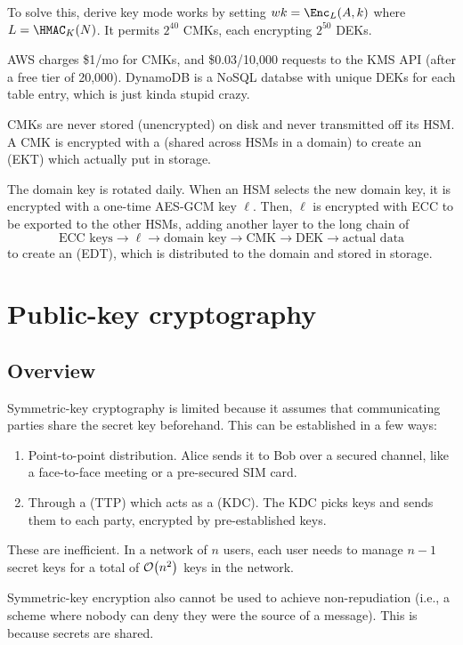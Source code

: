 \documentclass[class=co487,tikz,minted,notes]{agony}
\begin{document}
To solve this, derive key mode works by setting
$wk = \Enc_L(A,k)$ where $L = \HMAC_K(N)$.
It permits $2^{40}$ CMKs, each encrypting $2^{50}$ DEKs.

AWS charges \$1/mo for CMKs, and \$0.03/10,000 requests to the KMS API
(after a free tier of 20,000).
DynamoDB is a NoSQL databse with unique DEKs for each table entry,
which is just kinda stupid crazy.

CMKs are never stored (unencrypted) on disk and never transmitted off its HSM.
A CMK is encrypted with a  (shared across HSMs in a domain)
to create an  (EKT) which actually put in storage.

The domain key is rotated daily.
When an HSM selects the new domain key, it is encrypted with a one-time AES-GCM key $\ell$.
Then, $\ell$ is encrypted with ECC to be exported to the other HSMs,
adding another layer to the long chain of
\[
  \text{ECC keys} \to \ell \to \text{domain key} \to \text{CMK} \to \text{DEK} \to \text{actual data}
\]
to create an  (EDT),
which is distributed to the domain and stored in storage.

\chapter{Public-key cryptography}
\section{Overview}
Symmetric-key cryptography is limited because it assumes that
communicating parties share the secret key beforehand.
This can be established in a few ways:
\begin{enumerate}
  \item Point-to-point distribution. Alice sends it to Bob over a secured channel,
        like a face-to-face meeting or a pre-secured SIM card.
  \item Through a  (TTP) which acts as a  (KDC).
        The KDC picks keys and sends them to each party, encrypted by pre-established keys.
\end{enumerate}
These are inefficient.
In a network of $n$ users, each user needs to manage $n-1$ secret keys
for a total of $\order{n^2}$ keys in the network.

Symmetric-key encryption also cannot be used to achieve non-repudiation
(i.e., a scheme where nobody can deny they were the source of a message).
This is because secrets are shared.
\end{document}
